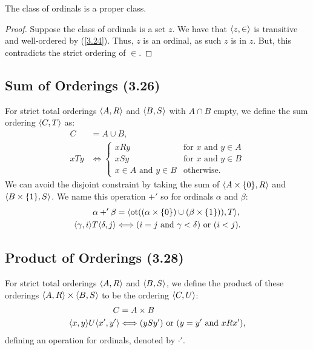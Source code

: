 The class of ordinals is a proper class.

\begin{proof}
    Suppose the class of ordinals is a set $z$.
    We have that ${\langle z, \in \rangle}$ is transitive and
    well-ordered by (\ref{3.24}). Thus, $z$ is an ordinal,
    as such $z$ is in $z$. But, this contradicts the
    strict ordering of $\in$.
\end{proof}

\subsection{Sum of Orderings (3.26)} \label{3.26}

For strict total orderings ${\langle A, R \rangle}$ and ${\langle B, S \rangle}$ 
with $A \cap B$ empty, we define the sum ordering ${\langle C, T \rangle}$ as: \begin{align*}
    C &= A \cup B, \\
    x T y &\Longleftrightarrow \begin{cases}
        x R y & \text{for } x \text{ and } y \in A \\
        x S y & \text{for } x \text{ and } y \in B \\
        x \in A \text{ and } y \in B & \text{otherwise}.
    \end{cases}
\end{align*} We can avoid the disjoint constraint by taking
the sum of ${\langle A \times \{0\}, R \rangle}$ and \linebreak
${\langle B \times \{1\}, S \rangle}$. We name this operation $+'$ so 
for ordinals $\alpha$ and $\beta$: \begin{align*}
    \alpha +' \beta &= {\langle \operatorname{ot}(
        (\alpha \times \{0\}) \cup (\beta \times \{1\})
    ), T \rangle}, \\
    {\langle \gamma, i \rangle} T {\langle \delta, j \rangle} 
    &\Longleftrightarrow (i = j \text{ and } \gamma < \delta)
    \text{ or } (i < j).
\end{align*}

\subsection{Product of Orderings (3.28)} \label{3.28}

For strict total orderings ${\langle A, R \rangle}$ and ${\langle B, S \rangle}$,
we define the product of these orderings ${\langle A, R \rangle} \times {\langle B, S \rangle}$
to be the ordering ${\langle C, U \rangle}$: \begin{align*}
    C &= A \times B \\
    {\langle x, y \rangle}U{\langle x', y' \rangle} 
    &\Longleftrightarrow 
    (ySy') \text{ or } (y = y' \text{ and } xRx'),
\end{align*} defining an operation for ordinals, denoted by $\cdot'$.

